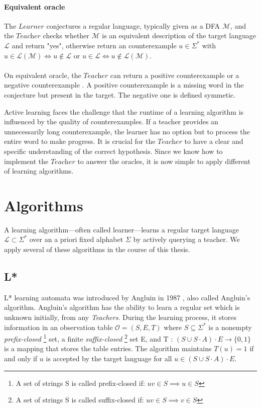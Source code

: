 \paragraph*{Equivalent oracle} 
The $\textit{Learner}$ conjectures a regular language, typically given as a DFA $\mathcal{M}$, 
and the $\textit{Teacher}$ checks whether $\mathcal{M}$ is an equivalent description of the target 
language $\mathcal{L}$ and return "yes", otherwise return an counterexample $u \in \Sigma^{*}$ with 
$u \in \mathcal{L}(\mathcal{M}) \Longleftrightarrow u \notin \mathcal{L}$ or 
$u \in \mathcal{L} \Longleftrightarrow u \notin \mathcal{L}(\mathcal{M})$.
\paragraph*{}
On equivalent oracle, the $\textit{Teacher}$ can return a positive counterexample or a negative counterexample \cite{chen2017learning}.
A positive counterexample is a missing word in the conjecture but present in the target.
The negative one is defined symmetic.

Active learning faces the challenge that the runtime of a learning algorithm is 
influenced by the quality of counterexamples. 
If a teacher provides an unnecessarily long counterexample, 
the learner has no option but to process the entire word to make progress.
It is crucial for the $\textit{Teacher}$ to have a clear and specific understanding of the 
correct hypothesis.
Since we know how to implement the $\textit{Teacher}$ to answer the oracles, it is now simple 
to apply different of learning algorithms.
\section{Algorithms}\label{section:learner_learning}
A learning algorithm—often called learner—learns a regular target 
language $\mathcal{L} \subset \Sigma^{*}$ over an a priori fixed alphabet $\Sigma$ by actively querying a teacher.
We apply several of these algorithms in the course of this thesis.
\subsection{L*}
L* learning automata was introduced by Angluin in 1987 \cite{ANGLUIN198787},
also called Angluin's algorithm.
Angluin's algorithm has the ability to learn a 
regular set which is unknown initially, from any \textit{Teachers}.
During the learning process, it stores
information in an observation table 
$\mathcal{O} = (S, E, T)$ where $S \subseteq \Sigma^*$ is a nonempty
\textit{prefix-closed} \footnote{A set of strings S is called prefix-closed if: $uv \in S \implies u \in S$} set, 
a finite \textit{suffix-closed} \footnote{A set of strings S is called suffix-closed if: $uv \in S \implies v \in S$} set E,
and T : $(S \cup S \cdot A) \cdot E \rightarrow \lbrace 0, 1 \rbrace$ 
is a mapping that stores the table entries.
The algorithm maintains $T(u) = 1$ if and only if $u$ is accepted by the target language for all 
$u \in (S \cup S \cdot A) \cdot E$.

